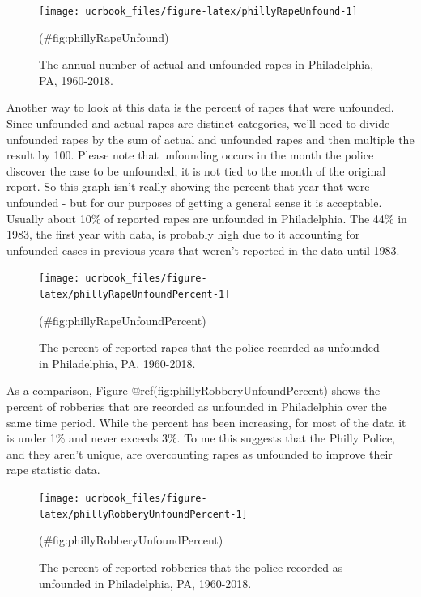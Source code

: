 \documentclass[
  12pt,
  openany]{book}
\begin{document}
\begin{figure}

{\centering \texttt{[image: ucrbook\_files/figure-latex/phillyRapeUnfound-1]} 

}

\caption{The annual number of actual and unfounded rapes in Philadelphia, PA, 1960-2018.}(\#fig:phillyRapeUnfound)
\end{figure}

Another way to look at this data is the percent of rapes that were unfounded. Since unfounded and actual rapes are distinct categories, we'll need to divide unfounded rapes by the sum of actual and unfounded rapes and then multiple the result by 100. Please note that unfounding occurs in the month the police discover the case to be unfounded, it is not tied to the month of the original report. So this graph isn't really showing the percent that year that were unfounded - but for our purposes of getting a general sense it is acceptable. Usually about 10\% of reported rapes are unfounded in Philadelphia. The 44\% in 1983, the first year with data, is probably high due to it accounting for unfounded cases in previous years that weren't reported in the data until 1983.

\begin{figure}

{\centering \texttt{[image: ucrbook\_files/figure-latex/phillyRapeUnfoundPercent-1]} 

}

\caption{The percent of reported rapes that the police recorded as unfounded in Philadelphia, PA, 1960-2018.}(\#fig:phillyRapeUnfoundPercent)
\end{figure}

As a comparison, Figure @ref(fig:phillyRobberyUnfoundPercent) shows the percent of robberies that are recorded as unfounded in Philadelphia over the same time period. While the percent has been increasing, for most of the data it is under 1\% and never exceeds 3\%. To me this suggests that the Philly Police, and they aren't unique, are overcounting rapes as unfounded to improve their rape statistic data.

\begin{figure}

{\centering \texttt{[image: ucrbook\_files/figure-latex/phillyRobberyUnfoundPercent-1]} 

}

\caption{The percent of reported robberies that the police recorded as unfounded in Philadelphia, PA, 1960-2018.}(\#fig:phillyRobberyUnfoundPercent)
\end{figure}
\end{document}
